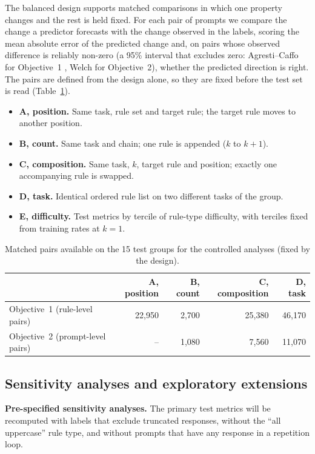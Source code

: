 \documentclass[10pt]{article}
\begin{document}
The balanced design supports matched comparisons in which one property changes and the rest is held fixed. For each
pair of prompts we compare the change a predictor forecasts with the change observed in the labels, scoring the mean
absolute error of the predicted change and, on pairs whose observed difference is reliably non-zero (a 95\% interval that excludes zero: Agresti--Caffo for
Objective~1 \citep{agresti2000}, Welch for Objective~2), whether the predicted direction is right. The pairs are defined from the design alone, so they are
fixed before the test set is read (Table~\ref{tab:pairs}).
\begin{itemize}
\item \textbf{A, position.} Same task, rule set and target rule; the target rule moves to another position.
\item \textbf{B, count.} Same task and chain; one rule is appended ($k$ to $k+1$).
\item \textbf{C, composition.} Same task, $k$, target rule and position; exactly one accompanying rule is swapped.
\item \textbf{D, task.} Identical ordered rule list on two different tasks of the group.
\item \textbf{E, difficulty.} Test metrics by tercile of rule-type difficulty, with terciles fixed from training rates
at $k=1$.
\end{itemize}

\begin{table}[t]
\centering\small
\caption{Matched pairs available on the 15 test groups for the controlled analyses (fixed by the design).}
\label{tab:pairs}
\begin{tabular}{lrrrr}
\toprule
 & A, position & B, count & C, composition & D, task \\
\midrule
Objective~1 (rule-level pairs) & 22,950 & 2,700 & 25,380 & 46,170 \\
Objective~2 (prompt-level pairs) & -- & 1,080 & 7,560 & 11,070 \\
\bottomrule
\end{tabular}
\end{table}

\subsection{Sensitivity analyses and exploratory extensions}

\textbf{Pre-specified sensitivity analyses.} The primary test metrics will be recomputed with labels that exclude
truncated responses, without the ``all uppercase'' rule type, and without prompts that have any response in a
repetition loop.
\end{document}
